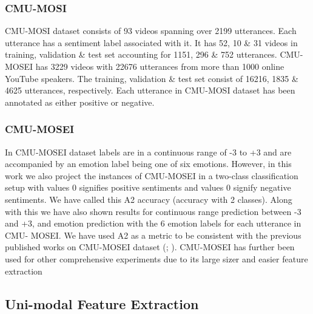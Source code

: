 \documentclass[11pt,a4paper]{article}
\begin{document}
\subsubsection{CMU-MOSI}
CMU-MOSI dataset consists of 93 videos spanning over 2199 utterances. Each utterance has a sentiment label associated with it. It has 52, 10 \& 31 videos in training, validation \& test set accounting for 1151, 296 \& 752 utterances. CMU-MOSEI has 3229 videos with 22676 utterances from more than 1000 online YouTube speakers. The training, validation \& test set consist of 16216, 1835 \& 4625 utterances, respectively. Each utterance in CMU-MOSI dataset has been annotated as either positive or negative. 

\subsubsection{CMU-MOSEI}
In CMU-MOSEI dataset labels are in a continuous range of -3 to +3 and are accompanied by an emotion label being one of six emotions. However, in this work we also project the instances of CMU-MOSEI in a two-class classification setup with values  0 signifies positive sentiments and values  0 signify negative sentiments. We have called this A2 accuracy (accuracy with 2 classes). Along with this we have also shown results for continuous range prediction between -3 and +3, and emotion prediction with the 6 emotion labels for each utterance in CMU- MOSEI. We have used A2 as a metric to be consistent with the previous published works on CMU-MOSEI dataset (\citealp{ghosal}; \citealp{mosei}). CMU-MOSEI has further been used for other comprehensive experiments due to its large sizer and easier feature extraction
\subsection{Uni-modal Feature Extraction}
\end{document}
